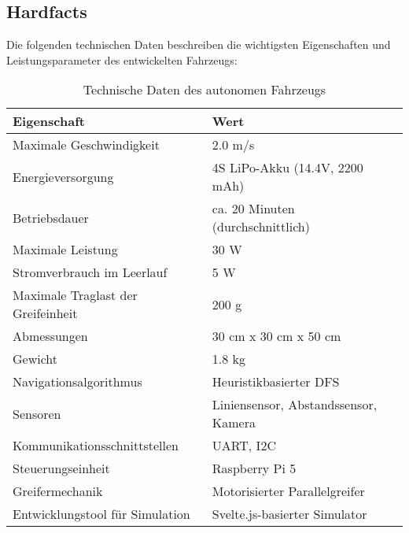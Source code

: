 \documentclass[main.tex]{subfiles} %
\begin{document}

\subsection{Hardfacts}

Die folgenden technischen Daten beschreiben die wichtigsten Eigenschaften und Leistungsparameter des entwickelten Fahrzeugs:

\begin{table}[h!]
    \centering
    \renewcommand{\arraystretch}{1.5}
    \begin{tabular}{|l|l|}
        \hline
        \textbf{Eigenschaft}            & \textbf{Wert} \\ \hline
        Maximale Geschwindigkeit        & 2.0 m/s       \\ \hline
        Energieversorgung               & 4S LiPo-Akku (14.4V, 2200 mAh) \\ \hline
        Betriebsdauer                   & ca. 20 Minuten (durchschnittlich) \\ \hline
        Maximale Leistung               & 30 W          \\ \hline
        Stromverbrauch im Leerlauf      & 5 W           \\ \hline
        Maximale Traglast der Greifeinheit & 200 g       \\ \hline
        Abmessungen                     & 30 cm x 30 cm x 50 cm \\ \hline
        Gewicht                         & 1.8 kg        \\ \hline
        Navigationsalgorithmus          & Heuristikbasierter DFS \\ \hline
        Sensoren                        & Liniensensor, Abstandssensor, Kamera \\ \hline
        Kommunikationsschnittstellen    & UART, I2C     \\ \hline
        Steuerungseinheit               & Raspberry Pi 5 \\ \hline
        Greifermechanik                 & Motorisierter Parallelgreifer \\ \hline
        Entwicklungstool für Simulation & Svelte.js-basierter Simulator \\ \hline
    \end{tabular}
    \caption{Technische Daten des autonomen Fahrzeugs}
    \label{tab:hardfacts}
\end{table}
\end{document}
